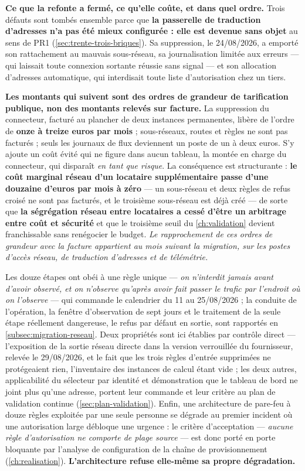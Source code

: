 \medskip
\noindent\textbf{Ce que la refonte a fermé, ce qu'elle coûte, et dans quel ordre.}
Trois défauts sont tombés ensemble parce que \textbf{la passerelle de traduction d'adresses n'a pas
été mieux configurée : elle est devenue sans objet} au sens de PR1
(\cref{sec:trente-trois-briques}). Sa suppression, le 24/08/2026, a emporté son rattachement au
mauvais sous-réseau, sa journalisation limitée aux erreurs --- qui laissait toute connexion
sortante réussie sans signal --- et son allocation d'adresses automatique, qui interdisait toute
liste d'autorisation chez un tiers.

\textbf{Les montants qui suivent sont des ordres de grandeur de tarification publique, non des
montants relevés sur facture.} La suppression du connecteur, facturé au plancher de deux instances
permanentes, libère de l'ordre de \textbf{onze à treize euros par mois} ; sous-réseaux, routes et
règles ne sont pas facturés ; seuls les journaux de flux deviennent un poste de un à deux euros. S'y
ajoute un coût évité qui ne figure dans aucun tableau, la montée en charge du connecteur, qui
disparaît \emph{en tant que risque}. La conséquence est structurante : \textbf{le coût marginal
réseau d'un locataire supplémentaire passe d'une douzaine d'euros par mois à zéro} --- un
sous-réseau et deux règles de refus croisé ne sont pas facturés, et le troisième sous-réseau est
déjà créé --- de sorte que \textbf{la ségrégation réseau entre locataires a cessé d'être un
arbitrage entre coût et sécurité} et que le troisième seuil du \cref{ch:validation} devient
franchissable sans renégocier le budget. \emph{Le rapprochement de ces ordres de grandeur avec la
facture appartient au mois suivant la migration, sur les postes d'accès réseau, de traduction
d'adresses et de télémétrie.}

Les douze étapes ont obéi à une règle unique --- \emph{on n'interdit jamais avant d'avoir observé,
et on n'observe qu'après avoir fait passer le trafic par l'endroit où on l'observe} --- qui commande
le calendrier du 11 au 25/08/2026 ; la conduite de l'opération, la fenêtre d'observation de sept
jours et le traitement de la seule étape réellement dangereuse, le refus par défaut en sortie, sont
rapportés en \cref{subsec:migration-reseau}. Deux propriétés sont ici établies par contrôle
direct --- l'exposition de la sortie réseau directe dans la version verrouillée du fournisseur,
relevée le 29/08/2026, et le fait que les trois règles d'entrée supprimées ne protégeaient rien,
l'inventaire des instances de calcul étant vide ; les deux autres, applicabilité du sélecteur par
identité et démonstration que le tableau de bord ne joint plus qu'une adresse, portent leur commande
et leur critère au plan de validation continue (\cref{sec:plan-validation}). Enfin, une
architecture de pare-feu à douze règles exploitée par une seule personne se dégrade au premier
incident où une autorisation large débloque une urgence : le critère d'acceptation ---
\emph{aucune règle d'autorisation ne comporte de plage source} --- est donc porté en porte
bloquante par l'analyse de configuration de la chaîne de provisionnement (\cref{ch:realisation}).
\textbf{L'architecture refuse elle-même sa propre dégradation.}

